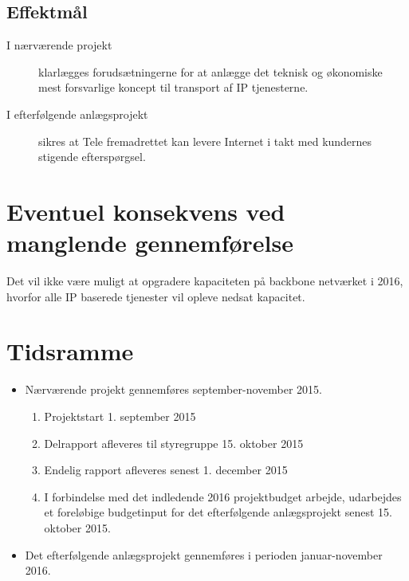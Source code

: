 \documentclass[11pt,a4paper]{article}
\begin{document}
\subsection{Effektmål}
\begin{description}
\item [I nærværende projekt ]klarlægges forudsætningerne for at anlægge det teknisk og økonomiske mest forsvarlige koncept til transport af IP tjenesterne.
\item [I efterfølgende anlægsprojekt] sikres at Tele fremadrettet kan levere Internet i takt med kundernes stigende efterspørgsel.
\end{description}
\section{Eventuel konsekvens ved manglende gennemførelse}
Det vil ikke være muligt at opgradere kapaciteten på backbone netværket i 2016, hvorfor alle IP baserede tjenester vil opleve nedsat kapacitet.
\section{Tidsramme}
\begin{itemize}
\item Nærværende projekt gennemføres september-november 2015.
\begin{enumerate}
\item Projektstart 1. september 2015
\item Delrapport afleveres til styregruppe 15. oktober 2015
\item Endelig rapport afleveres senest 1. december 2015
\item I forbindelse med det indledende 2016 projektbudget arbejde, udarbejdes et foreløbige budgetinput for det efterfølgende anlægsprojekt senest 15. oktober 2015.
\end{enumerate}
\item Det efterfølgende anlægsprojekt gennemføres i perioden januar-november 2016.
\end{itemize}
\end{document}
